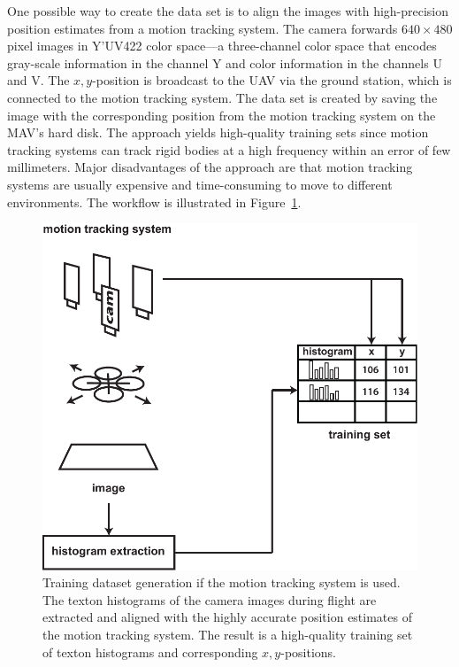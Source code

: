 \documentclass[11pt]{report}
\begin{document}
One possible way to create the data set is to align the images with
high-precision position estimates from a motion tracking system.  The
camera forwards $640 \times 480$ pixel images in Y'UV422 color
space---a three-channel color space that encodes gray-scale
information in the channel Y and color information in the channels U
and V.
The $x,y$-position is broadcast to the UAV via the ground station,
which is connected to the motion tracking system.  The data set is
created by saving the image with the corresponding position from the
motion tracking system on the MAV's hard disk. The approach yields
high-quality training sets since motion tracking systems can track
rigid bodies at a high frequency within an error of few
millimeters. Major disadvantages of the approach are that motion
tracking systems are usually expensive and time-consuming to move to
different environments. The workflow is illustrated in
Figure~\ref{fig:overviewn}.
\begin{figure}[h]
\begin{center}
\includegraphics[width=0.56\columnwidth]{overview_new}
\caption{{\label{fig:overviewn}Training dataset generation if the motion tracking system is
    used. The texton histograms of the camera images during flight are
    extracted and aligned with the highly accurate position estimates
    of the motion tracking system. The result is a high-quality
    training set of texton histograms and corresponding
    $x,y$-positions.%
  }}
\end{center}
\end{figure}
\end{document}
